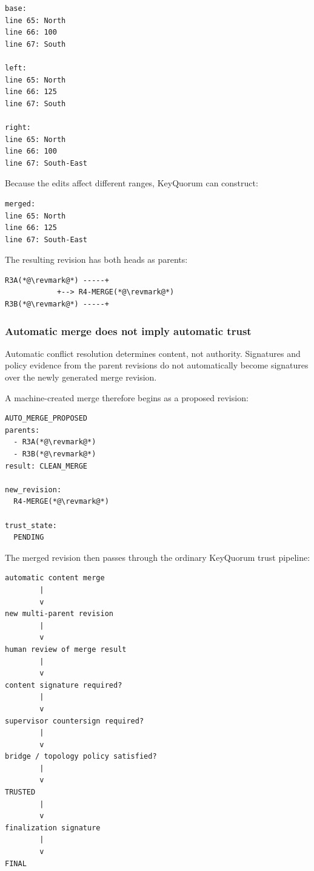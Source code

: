 \documentclass[11pt]{article}
\begin{document}
\begin{lstlisting}
base:
line 65: North
line 66: 100
line 67: South

left:
line 65: North
line 66: 125
line 67: South

right:
line 65: North
line 66: 100
line 67: South-East
\end{lstlisting}

Because the edits affect different ranges, KeyQuorum can construct:

\begin{lstlisting}
merged:
line 65: North
line 66: 125
line 67: South-East
\end{lstlisting}

The resulting revision has both heads as parents:

\begin{lstlisting}
R3A(*@\revmark@*) -----+
            +--> R4-MERGE(*@\revmark@*)
R3B(*@\revmark@*) -----+
\end{lstlisting}

\subsubsection*{Automatic merge does not imply automatic trust}

Automatic conflict resolution determines content, not authority. Signatures and policy evidence from the parent revisions do not automatically become signatures over the newly generated merge revision.

A machine-created merge therefore begins as a proposed revision:

\begin{lstlisting}
AUTO_MERGE_PROPOSED
parents:
  - R3A(*@\revmark@*)
  - R3B(*@\revmark@*)
result: CLEAN_MERGE

new_revision:
  R4-MERGE(*@\revmark@*)

trust_state:
  PENDING
\end{lstlisting}

The merged revision then passes through the ordinary KeyQuorum trust pipeline:

\begin{lstlisting}
automatic content merge
        |
        v
new multi-parent revision
        |
        v
human review of merge result
        |
        v
content signature required?
        |
        v
supervisor countersign required?
        |
        v
bridge / topology policy satisfied?
        |
        v
TRUSTED
        |
        v
finalization signature
        |
        v
FINAL
\end{lstlisting}
\end{document}
